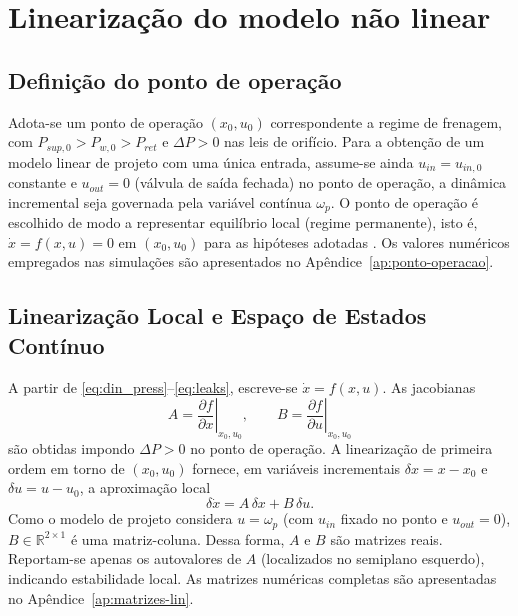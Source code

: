 \section{Linearização do modelo não linear}
\label{sec:controle-linearizacao-2p}



\subsection{Definição do ponto de operação}
\label{sec:definicao-ponto-operacao}
Adota-se um ponto de operação $(x_0,u_0)$ correspondente a regime de frenagem, com $P_{sup,0}>P_{w,0}>P_{ret}$ e $\Delta P>0$ nas leis de orifício. Para a obtenção de um modelo linear de projeto com uma única entrada, assume-se ainda $u_{in}=u_{in,0}$ constante e $u_{out}=0$ (válvula de saída fechada) no ponto de operação, a dinâmica incremental seja governada pela variável contínua $\omega_p$. O ponto de operação é escolhido de modo a representar equilíbrio local (regime permanente), isto é, $\dot{x}=f(x,u)=0$ em $(x_0,u_0)$ para as hipóteses adotadas \cite{FranklinPowellWorkman1998,Ogata1997}. Os valores numéricos empregados nas simulações são apresentados no Apêndice~\ref{ap:ponto-operacao}.

\subsection{Linearização Local e Espaço de Estados Contínuo}
\label{sec:derivacao-matrizes-jacobianas}
A partir de \eqref{eq:din_press}–\eqref{eq:leaks}, escreve-se $\dot{x}=f(x,u)$. As jacobianas
\[
    A=\left.\frac{\partial f}{\partial x}\right|_{x_0,u_0},
    \qquad
    B=\left.\frac{\partial f}{\partial u}\right|_{x_0,u_0}
\]
são obtidas impondo $\Delta P>0$ no ponto de operação. A linearização de primeira ordem em torno de $(x_0,u_0)$ fornece, em variáveis incrementais $\delta x = x-x_0$ e $\delta u = u-u_0$, a aproximação local
\[
    \delta\dot{x} = A\,\delta x + B\,\delta u.
\]
Como o modelo de projeto considera $u=\omega_p$ (com $u_{in}$ fixado no ponto e $u_{out}=0$), $B\in\mathbb{R}^{2\times 1}$ é uma matriz-coluna. Dessa forma, $A$ e $B$ são matrizes reais. Reportam-se apenas os autovalores de $A$ (localizados no semiplano esquerdo), indicando estabilidade local. As matrizes numéricas completas são apresentadas no Apêndice~\ref{ap:matrizes-lin}.
